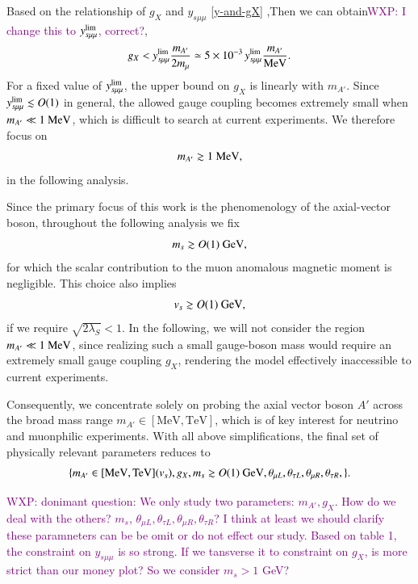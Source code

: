 \documentclass[onecolumn, aps, nofootinbib, prd, preprint, floats, floatfix, amsmath, amssymb, superscriptaddress, preprintnumbers]{revtex4-2}
\newcommand{\WXP}[1]{\textcolor{purple} {WXP: #1}}
\begin{document}
Based on the relationship of $g_X$ and $y_{s\mu\mu}$ \eqref{y-and-gX} ,Then we can obtain\WXP{I change this to $y_{s\mu\mu}^{\rm lim}$, correct?}, 
\begin{equation}
g_X<y_{s\mu\mu}^{\rm lim}\frac{m_{A'}}{2m_\mu}
\simeq
5\times10^{-3}
\,y_{s\mu\mu}^{\rm lim}
\frac{m_{A'}}{\rm MeV}.
\end{equation}
For a fixed value of $y_{s\mu\mu}^{\rm lim}$, the upper bound on $g_X$ is linearly with $m_{A'}$. Since $y_{s\mu\mu}^{\rm lim}\lesssim O(1)$ in general, the allowed gauge coupling becomes extremely small when $m_{A'}\ll1~{\rm MeV}$, which is difficult to search at current experiments. We therefore focus on
\begin{equation}
m_{A'}\gtrsim1~{\rm MeV},
\end{equation}
in the following analysis.


Since the primary focus of this work is the phenomenology of the axial-vector boson, throughout the following analysis we fix
\begin{equation}
m_s \gtrsim O(1)~{\rm GeV},
\end{equation}
for which the scalar contribution to the muon anomalous magnetic moment is negligible.
This choice also implies
\begin{equation}
v_s \gtrsim  O(1)~{\rm GeV},
\end{equation}
if we require $\sqrt{2 \lambda_S} < 1$.
In the following, we will not consider the region
$m_{A'}\ll1~{\rm MeV}$,
since realizing such a small gauge-boson mass would require an extremely small gauge coupling $g_X$, rendering the model effectively inaccessible to current experiments.


Consequently, we concentrate solely on probing the axial vector boson $A'$ across the broad mass range $m_{A'}\in [\mathrm{MeV}, \mathrm{TeV}]$, which is of key interest for neutrino and muonphilic experiments. With all above simplifications, the final set of physically relevant parameters reduces to
\begin{equation}
   \{m_{A'}\in [\mathrm{MeV}, \mathrm{TeV}] (v_s), g_{X}, m_s \gtrsim O(1)~{\rm GeV}, \theta_{\mu L}, \theta_{\tau L}, \theta_{\mu R},\theta_{\tau R},\}.
\end{equation}

\WXP{donimant question: We only study two parameters: $m_{A'}, g_X$. How do we deal with the others? $m_s$, $\theta_{\mu L}, \theta_{\tau L}, \theta_{\mu R},\theta_{\tau R}$? I think at least we should clarify these paramneters can be be omit or do not effect our study. Based on table 1, the constraint on $y_{s\mu\mu}$ is so strong. If we tansverse it to constraint on $g_X$, is more strict than our money plot? So we consider $m_s> 1$ GeV? }
\end{document}
